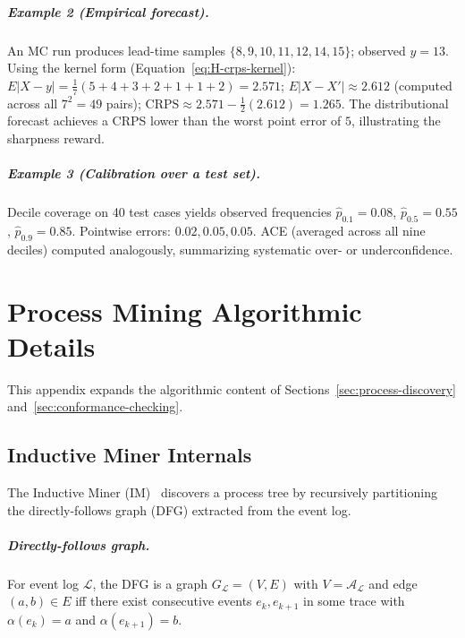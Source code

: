 \paragraph{Example 2 (Empirical forecast).} An MC run produces lead-time
samples $\{8, 9, 10, 11, 12, 14, 15\}$; observed $y = 13$. Using the
kernel form (Equation~\ref{eq:H-crps-kernel}):
$E |X - y| = \frac{1}{7}(5+4+3+2+1+1+2) = 2.571$;
$E |X - X'| \approx 2.612$ (computed across all $7^2 = 49$ pairs);
$\mathrm{CRPS} \approx 2.571 - \tfrac{1}{2}(2.612) = 1.265$. The
distributional forecast achieves a CRPS lower than the worst point error
of $5$, illustrating the sharpness reward.

\paragraph{Example 3 (Calibration over a test set).} Decile coverage on
40 test cases yields observed frequencies $\hat{p}_{0.1} = 0.08$,
$\hat{p}_{0.5} = 0.55$, $\hat{p}_{0.9} = 0.85$. Pointwise errors:
$0.02, 0.05, 0.05$. ACE (averaged across all nine deciles) computed
analogously, summarizing systematic over- or underconfidence.


\chapter{Process Mining Algorithmic Details}
\label{app:I}

This appendix expands the algorithmic content of Sections~\ref{sec:process-discovery}
and~\ref{sec:conformance-checking}.


\section{Inductive Miner Internals}
\label{app:I-im}

The Inductive Miner (IM)~\cite{leemans2013discovering} discovers a process
tree by recursively partitioning the directly-follows graph (DFG) extracted
from the event log.

\paragraph{Directly-follows graph.} For event log $\mathcal{L}$, the DFG is
a graph $G_{\mathcal{L}} = (V, E)$ with $V = \mathcal{A}_{\mathcal{L}}$
and edge $(a, b) \in E$ iff there exist consecutive events $e_k, e_{k+1}$
in some trace with $\alpha(e_k) = a$ and $\alpha(e_{k+1}) = b$.

